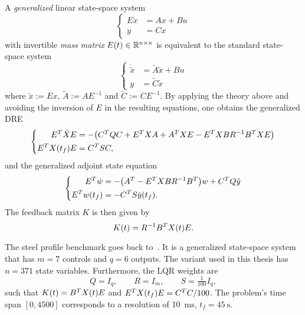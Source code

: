 \begin{remark}
  A \emph{generalized} linear state-space system
  \begin{equation}
  \label{eq:basics:system:generalized}
  \left\{
  \begin{aligned}
    E \dot x &= Ax + Bu \\
    y &= Cx
  \end{aligned}
  \right.
  \end{equation}
  with invertible \emph{mass matrix} $E(t)\in\mathbb{R}^{n\times n}$ is equivalent to the
  standard state-space system
  \begin{equation}
  \left\{
  \begin{aligned}
    \dot{\tilde x} &= \tilde A \tilde x + Bu \\
    y &= \tilde C \tilde x
  \end{aligned}
  \right.
  \end{equation}
  where $\tilde x := E x$, $\tilde A := A E^{-1}$ and $\tilde C := C E^{-1}$.
  By applying the theory above
  and avoiding the inversion of $E$ in the resulting equations,
  one obtains the generalized \ac{DRE}
  \begin{equation}
  \left\{
  \begin{aligned}
    E^T \dot X E &= -\big( C^T Q C + E^T X A + A^T X E - E^T X B R^{-1} B^T X E \big) \\
    E^T X(t_f) E &= C^T S C
    ,
  \end{aligned}
  \right.
  \end{equation}
  and the generalized adjoint state equation
  \begin{equation}
  \left\{
  \begin{aligned}
    E^T \dot w &= - \big( A^T - E^T X B R^{-1} B^T \big) w + C^T Q \hat y \\
    E^T w(t_f) &= - C^T S \hat y(t_f)
    .
  \end{aligned}
  \right.
  \end{equation}
  The feedback matrix $K$ is then given by
  \begin{equation}
    K(t) = R^{-1} B^T X(t) E
    .
  \end{equation}
\end{remark}

\begin{example}
\label{thm:rail:parameters}
  The steel profile benchmark \cite{morwiki_steel} goes back to~\cite{Benner2005}.
  It is a generalized state-space system that has $m=7$ controls and $q=6$ outputs.
  The variant used in this thesis has $n=371$ state variables.
  Furthermore, the \ac{LQR} weights are
  \begin{equation*}
    Q = I_q,
    \qquad
    R = I_m,
    \qquad
    S = \tfrac{1}{100} I_q,
  \end{equation*}
  such that $K(t) = B^T X(t) E$
  and $E^T X(t_f) E = C^T C /100$.
  The problem's time span $[0,4500]$ corresponds to a resolution of \SI{10}{\milli\second},
  \ie $t_f = \SI{45}{\second}$.
\end{example}

